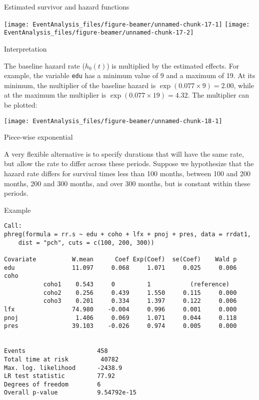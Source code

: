 \documentclass[10pt,ignorenonframetext,]{beamer}
\begin{document}
\begin{frame}{Estimated survivor and hazard functions}

\texttt{[image: EventAnalysis\_files/figure-beamer/unnamed-chunk-17-1]}
\texttt{[image: EventAnalysis\_files/figure-beamer/unnamed-chunk-17-2]}

\end{frame}

\begin{frame}[fragile]{Interpretation}

\small
The baseline hazard rate (\(h_0(t)\)) is multiplied by the estimated
effects. For example, the variable \texttt{edu} has a minimum value of 9
and a maximum of 19. At its minimum, the multiplier of the baseline
hazard is \(\exp(0.077 \times 9) = 2.00\), while at the maximum the
multiplier is \(\exp(0.077 \times 19) = 4.32\). The multiplier can be
plotted:

\begin{center}\texttt{[image: EventAnalysis\_files/figure-beamer/unnamed-chunk-18-1]} \end{center}

\end{frame}

\begin{frame}{Piece-wise exponential}

A very flexible alternative is to specify durations that will have the
same rate, but allow the rate to differ across these periods. Suppose we
hypothesize that the hazard rate differs for survival times less than
100 months, between 100 and 200 months, 200 and 300 months, and over 300
months, but is constant within these periods.

\end{frame}

\begin{frame}[fragile]{Example}

\scriptsize

\begin{verbatim}
Call:
phreg(formula = rr.s ~ edu + coho + lfx + pnoj + pres, data = rrdat1, 
    dist = "pch", cuts = c(100, 200, 300))

Covariate          W.mean      Coef Exp(Coef)  se(Coef)    Wald p
edu                11.097     0.068     1.071     0.025     0.006 
coho 
           coho1    0.543     0         1           (reference)
           coho2    0.256     0.439     1.550     0.115     0.000 
           coho3    0.201     0.334     1.397     0.122     0.006 
lfx                74.980    -0.004     0.996     0.001     0.000 
pnoj                1.406     0.069     1.071     0.044     0.118 
pres               39.103    -0.026     0.974     0.005     0.000 


Events                    458 
Total time at risk         40782 
Max. log. likelihood      -2438.9 
LR test statistic         77.92 
Degrees of freedom        6 
Overall p-value           9.54792e-15
\end{verbatim}

\end{frame}
\end{document}
